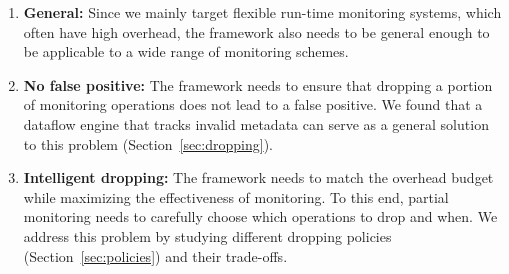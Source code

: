 \begin{enumerate}
  \item \textbf{General:} Since we mainly target flexible run-time monitoring systems,
  which often have high overhead, the framework also needs to be general enough to be
  applicable to a wide range of monitoring schemes.

  \item \textbf{No false positive:} The framework needs to ensure that dropping a portion
  of monitoring operations does not lead to a false positive. We found that a dataflow engine
  that tracks invalid metadata can serve as a general solution to this problem 
  (Section~\ref{sec:dropping}).

  \item \textbf{Intelligent dropping:} The framework needs to match the overhead budget
  while maximizing the effectiveness of monitoring. To this end, partial 
  monitoring needs to carefully choose which operations to drop and when. We address this
  problem by studying different dropping policies (Section~\ref{sec:policies}) and their
  trade-offs.

\end{enumerate}

